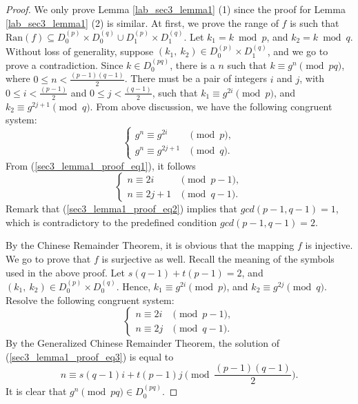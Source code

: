 \documentclass{mcom-l}
\theoremstyle{definition}
\numberwithin{equation}{section}
\begin{document}
            \begin{proof}
            We only prove Lemma \ref{lab_sec3_lemma1} (1) since the proof for Lemma \ref{lab_sec3_lemma1} (2) is similar. At first, we prove the range of $ f $ is such that $ \text{Ran}(f) \subseteq D_{0}^{(p)}\times D_{0}^{(q)}\cup D_{1}^{(p)}\times D_{1}^{(q)}$. Let $ k_{1}= k\bmod p$, and $k_{2}= k\bmod q$. Without loss of generality, suppose $ (k_{1},\ k_{2}) \in D_{0}^{(p)}\times D_{1}^{(q)}$, and we go to prove a contradiction. Since $ k\in D_{0}^{(pq)} $, there is a $ n $ such that $ k\equiv g^{n}\pmod{pq} $, where $ 0\leq n<\frac{(p-1)(q-1)}{2} $. There must be a pair of integers $ i $ and $ j $, with $ 0\leq i<\frac{(p-1)}{2}  $ and $ 0\leq j<\frac{(q-1)}{2}  $, such that $ k_{1}\equiv g^{2i}\pmod{p} $, and $ k_{2}\equiv g^{2j+1}\pmod{q} $. From above discussion, we have the following congruent system:
            \begin{equation}\label{sec3_lemma1_proof_eq1}
            \begin{cases}
            g^{n}\equiv g^{2i}  &\pmod{p},\\
            g^{n}\equiv g^{2j+1}&\pmod{q}.
            \end{cases}
            \end{equation}
            From (\ref{sec3_lemma1_proof_eq1}), it follows 
            \begin{equation}\label{sec3_lemma1_proof_eq2}
            \begin{cases}
            n\equiv 2i  &\pmod{p-1},\\
            n\equiv 2j+1  &\pmod{q-1}.
            \end{cases}
            \end{equation}
            Remark that (\ref{sec3_lemma1_proof_eq2}) implies that $ gcd(p-1,q-1) =1 $, which is contradictory to the predefined condition $ gcd(p-1,q-1) =2$.
            
            By the Chinese Remainder Theorem, it is obvious that the mapping $ f $ is injective. We go to prove that $ f $ is surjective as well. Recall the meaning of the symbols used in the above proof. Let $ s(q-1)+t(p-1)=2 $, and $ (k_{1},\ k_{2}) \in D_{0}^{(p)}\times D_{0}^{(q)} $. Hence, $ k_{1}\equiv g^{2i}\pmod{p} $,  and $k_{2}\equiv g^{2j}\pmod{q}$. Resolve the following congruent system:
            \begin{equation}\label{sec3_lemma1_proof_eq3}
            \begin{cases}
            n\equiv 2i  &\pmod{p-1},\\
            n\equiv 2j  &\pmod{q-1}.
            \end{cases}
            \end{equation}
            By the Generalized Chinese Remainder Theorem, the solution of (\ref{sec3_lemma1_proof_eq3}) is equal to
            \begin{equation}\label{sec3_lemma1_proof_eq4}
            n\equiv s(q-1)i+t(p-1)j \pmod{\dfrac{(p-1)(q-1)}{2}}.
            \end{equation}
            It is clear that $ g^{n}\pmod{pq}\in D_{0}^{(pq)} $.
            \end{proof}
            
\end{document}
